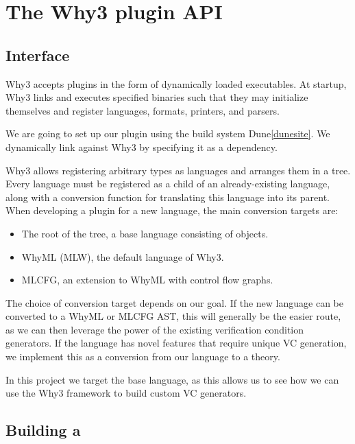 \section{The Why3 plugin API} %

\subsection{Interface} %

Why3 accepts plugins in the form of dynamically loaded executables.
At startup, Why3 links and executes specified binaries
such that they may initialize themselves and register languages, formats, printers, and parsers.

We are going to set up our plugin using the build system Dune\ref{dunesite}.
We dynamically link against Why3 by specifying it as a dependency.

Why3 allows registering arbitrary types as languages and arranges them in a tree.
Every language must be registered as a child of an already-existing language,
along with a conversion function for translating this language into its parent.
When developing a plugin for a new language,
the main conversion targets are:

\begin{itemize}
    \item The root of the tree, a base language consisting of  objects.
    \item WhyML (MLW), the default language of Why3.
    \item MLCFG, an extension to WhyML with control flow graphs.
\end{itemize}

The choice of conversion target depends on our goal.
If the new language can be converted to a WhyML or MLCFG AST,
this will generally be the easier route,
as we can then leverage the power of the existing verification condition generators.
If the language has novel features that require unique VC generation,
we implement this as a conversion from our language to a theory.

In this project we target the base language,
as this allows us to see how we can use the Why3 framework to build custom VC generators.

\subsection{Building a }


